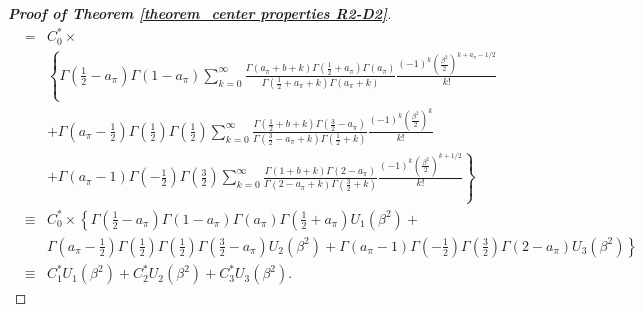 \documentclass[12pt]{article}
\begin{document}
\begin{proof} [\textbf{Proof of Theorem \ref{theorem_center properties R2-D2}}]
{\begin{eqnarray*}
			&=&  C_0^\ast  \times \\
			&& \left\{
			\Gamma(\frac{1}{2}-a_\pi)\Gamma(1-a_\pi)
			\sum\limits_{k=0}^{\infty} \frac{\Gamma(a_\pi+b+k) \Gamma(\frac{1}{2}+a_\pi)\Gamma(a_\pi)}{\Gamma(\frac{1}{2}+a_\pi+k)\Gamma(a_\pi+k) } \frac{(-1)^k(\frac{\beta^2}{2})^{k+a_\pi-1/2}} {k!} \right. \\
			&& +   \Gamma(a_\pi-\frac{1}{2}) \Gamma(\frac{1}{2}) \Gamma(\frac{1}{2})
			\sum\limits_{k=0}^{\infty} \frac{\Gamma(\frac{1}{2}+b+k) \Gamma(\frac{3}{2}-a_\pi)}{\Gamma(\frac{3}{2}-a_\pi+k)\Gamma(\frac{1}{2}+k)} \frac{(-1)^k(\frac{\beta^2}{2})^k}{k!} \\
			&& \left.  + \Gamma(a_\pi-1)\Gamma(-\frac{1}{2})   \Gamma(\frac{3}{2})
			\sum\limits_{k=0}^{\infty}  \frac{\Gamma(1+b+k)\Gamma(2-a_\pi)}{\Gamma(2-a_\pi+k)\Gamma(\frac{3}{2}+k)}
			\frac{(-1)^k(\frac{\beta^2}{2})^{k+1/2}}{k!}  \right\}\\
			&\equiv&  C_0^\ast  \times
			\left\{	\Gamma(\frac{1}{2}-a_\pi)\Gamma(1-a_\pi)\Gamma(a_\pi) \Gamma(\frac{1}{2}+a_\pi)U_1(\beta^2) +   \right. \\
			&& \left.
			\Gamma(a_\pi-\frac{1}{2}) \Gamma(\frac{1}{2})\Gamma(\frac{1}{2}) \Gamma(\frac{3}{2}-a_\pi) U_2(\beta^2)
			+  \Gamma(a_\pi-1)\Gamma(-\frac{1}{2})\Gamma(\frac{3}{2})\Gamma(2-a_\pi)   U_3(\beta^2)  \right\}	 \\
			&\equiv& C_1^\ast U_1(\beta^2) +  C_2^\ast U_2(\beta^2) +  C_3^\ast U_3(\beta^2) .

\end{eqnarray*}}
\end{proof}
\end{document}

